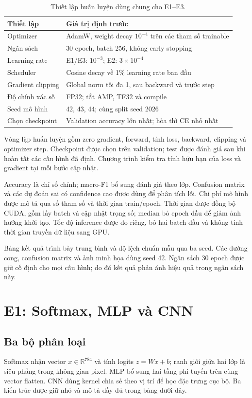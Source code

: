 \documentclass[12pt,a4paper]{report}
\numberwithin{equation}{chapter}
\newcommand{\R}{\mathbb{R}}
\begin{document}
\begin{table}[htbp]\centering
\begin{tabularx}{\textwidth}{@{}lX@{}}\toprule
Thiết lập & Giá trị định trước\\\midrule
Optimizer & AdamW, weight decay $10^{-4}$ trên các tham số trainable\\
Ngân sách & 30 epoch, batch 256, không early stopping\\
Learning rate & E1/E3: $10^{-3}$; E2: $3\times10^{-4}$\\
Scheduler & Cosine decay về 1\% learning rate ban đầu\\
Gradient clipping & Global norm tối đa 1, sau backward và trước step\\
Độ chính xác số & FP32; tắt AMP, TF32 và compile\\
Seed mô hình & 42, 43, 44; cùng split seed 2026\\
Chọn checkpoint & Validation accuracy lớn nhất; hòa thì CE nhỏ nhất\\\bottomrule
\end{tabularx}
\caption{Thiết lập huấn luyện dùng chung cho E1–E3.}
\end{table}

Vòng lặp huấn luyện gồm zero gradient, forward, tính loss, backward, clipping và optimizer step. Checkpoint được chọn trên validation; test được đánh giá sau khi hoàn tất các cấu hình đã định. Chương trình kiểm tra tính hữu hạn của loss và gradient tại mỗi bước cập nhật.

Accuracy là chỉ số chính; macro-F1 bổ sung đánh giá theo lớp. Confusion matrix và các dự đoán sai có confidence cao được dùng để phân tích lỗi. Chi phí mô hình được mô tả qua số tham số và thời gian train/epoch. Thời gian được đồng bộ CUDA, gồm lấy batch và cập nhật trọng số; median bỏ epoch đầu để giảm ảnh hưởng khởi tạo. Tốc độ inference được đo riêng, bỏ hai batch đầu và không tính thời gian truyền dữ liệu sang GPU.

Bảng kết quả trình bày trung bình và độ lệch chuẩn mẫu qua ba seed. Các đường cong, confusion matrix và ảnh minh họa dùng seed 42. Ngân sách 30 epoch được giữ cố định cho mọi cấu hình; do đó kết quả phản ánh hiệu quả trong ngân sách này.

\chapter{E1: Softmax, MLP và CNN}
\section{Ba bộ phân loại}
Softmax nhận vector $x\in\R^{784}$ và tính logits $z=Wx+b$; ranh giới giữa hai lớp là siêu phẳng trong không gian pixel. MLP bổ sung hai tầng phi tuyến trên cùng vector flatten. CNN dùng kernel chia sẻ theo vị trí để học đặc trưng cục bộ. Ba kiến trúc được giữ nhỏ và mô tả đầy đủ trong bảng dưới đây.
\end{document}
